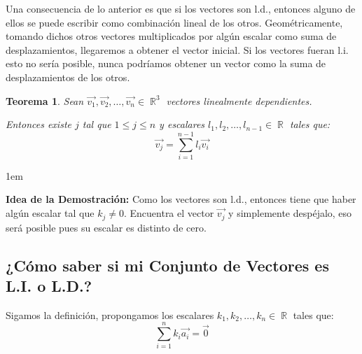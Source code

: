 \documentclass[12pt, fleqn]{report}                             %
\newenvironment{SmallIndentation}[1][0.75em]                    %
        {\begin{adjustwidth}{#1}{}\begin{footnotesize}}             %
        {\end{footnotesize}\end{adjustwidth}}                       %
\newtheorem{Theorem}{Teorema}[section]                          %
\theoremstyle{break}                                            %
\DeclareMathOperator \Reals        {\mathbb{R}}                 %
\begin{document}
                Una consecuencia de lo anterior es que si los vectores son l.d., entonces alguno de ellos se puede
                escribir como combinación lineal de los otros. Geométricamente, tomando dichos otros vectores
                multiplicados por algún escalar como suma de desplazamientos, llegaremos a obtener el vector inicial.
                Si los vectores fueran l.i. esto no sería posible, nunca podríamos obtener un vector como la suma de
                desplazamientos de los otros.
            
                \begin{Theorem}
                    Sean $\vec{v_1}, \vec{v_2}, \ldots, \vec{v_n} \in \Reals^3$ vectores linealmente dependientes.

                    Entonces existe $j$ tal que $1 \leq j \leq n$ y escalares $l_1, l_2, \ldots, l_{n-1} \in \Reals$
                    tales que:
                    \begin{equation*}
                        \vec{v_j} = \sum_{i=1}^{n-1} l_i \vec{v_i}   
                    \end{equation*}
                \end{Theorem}
        
                \begin{SmallIndentation}[1em]
                    \textbf{Idea de la Demostración:} 
                        Como los vectores son l.d., entonces tiene que haber algún escalar
                        tal que $k_j \neq 0$. Encuentra el vector $\vec{v_j}$ y simplemente
                        despéjalo, eso será posible pues su escalar es distinto de cero.
                \end{SmallIndentation}
            

            \subsection{¿Cómo saber si mi Conjunto de Vectores es L.I. o L.D.?}
            
                Sigamos la definición, propongamos los escalares $k_1, k_2, \ldots, k_n \in \Reals$ tales que:
                \begin{equation*}
                    \sum_{i = 1}^{n} k_i \vec{a_i} = \vec{0}   
                \end{equation*}
\end{document}
